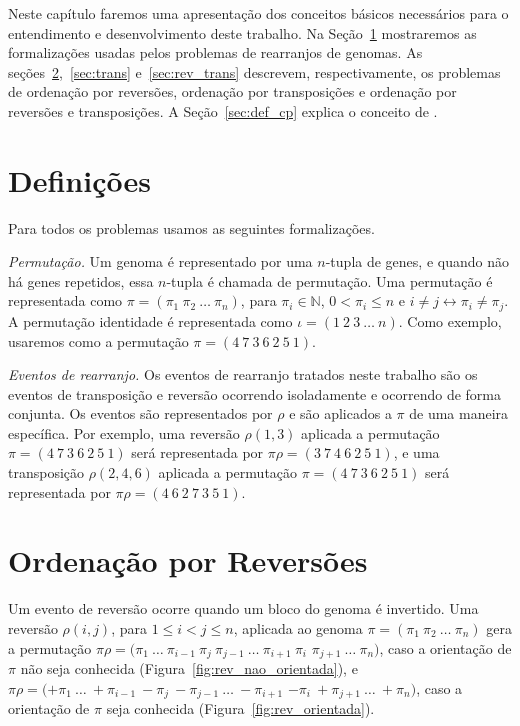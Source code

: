 Neste capítulo faremos uma apresentação dos conceitos básicos
necessários para o entendimento e desenvolvimento deste trabalho. Na
Seção~\ref{sec:defin} mostraremos as formalizações usadas pelos
problemas de rearranjos de genomas. As
seções~\ref{sec:rev},~\ref{sec:trans} e~\ref{sec:rev_trans} descrevem,
respectivamente, os problemas de ordenação por reversões, ordenação por
transposições e ordenação por reversões e transposições. A
Seção~\ref{sec:def_cp} explica o conceito de \pr{}.

\section{Definições}
\label{sec:defin}
Para todos os problemas usamos as seguintes formalizações.

\textit{Permutação.} Um genoma é representado por uma $n$-tupla de
genes, e quando não há genes repetidos, essa $n$-tupla é chamada de
permutação. Uma permutação é representada como $\pi =
(\pi_{1}~\pi_{2}~\ldots~\pi_{n})$, para $\pi_{i} \in \mathbb{N}$, $0 <
\pi_{i} \leq n$ e $i \neq j \leftrightarrow \pi_{i} \neq \pi_{j}$. A
permutação identidade é representada como $\iota = (1~2~3~\ldots~n)$.
Como exemplo, usaremos como a permutação $\pi = (4~7~3~6~2~5~1)$.

\textit{Eventos de rearranjo.} Os eventos de rearranjo tratados neste
trabalho são os eventos de transposição e reversão ocorrendo
isoladamente e ocorrendo de forma conjunta. Os eventos são representados
por $\rho$ e são aplicados a $\pi$ de uma maneira específica. Por
exemplo, uma reversão $\rho(1, 3)$ aplicada a permutação $\pi =
(4~7~3~6~2~5~1)$ será representada por $\pi\rho = (3~7~4~6~2~5~1)$, e
uma transposição $\rho(2,4,6)$ aplicada a permutação $\pi =
(4~7~3~6~2~5~1)$ será representada por $\pi\rho = (4~6~2~7~3~5~1)$.

\section{Ordenação por Reversões}
\label{sec:rev}
Um evento de reversão ocorre quando um bloco do genoma é invertido. Uma
reversão $\rho(i, j)$, para $1 \leq i < j \leq n$, aplicada ao genoma
$\pi = (\pi_{1}~\pi_{2}~\ldots~\pi_{n})$ gera a permutação $\pi\rho =
(\pi_{1}~\ldots~\pi_{i-1}~\pi_{j}~\pi_{j-1}~\ldots~\pi_{i+1}~\pi_{i}$
$\pi_{j+1}~\ldots~\pi_{n})$, caso a orientação de $\pi$ não seja
conhecida (Figura~\ref{fig:rev_nao_orientada}), e $\pi\rho =
(+\pi_{1}~\ldots~+\pi_{i-1}~-\pi_{j}~-\pi_{j-1}~\ldots~-\pi_{i+1}$
$-\pi_{i}~+\pi_{j+1}~\ldots~+\pi_{n})$, caso a orientação de $\pi$ seja
conhecida (Figura~\ref{fig:rev_orientada}).

